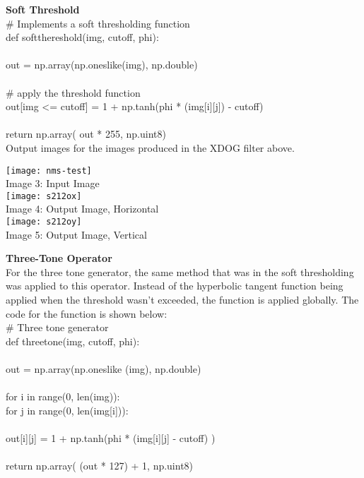 \documentclass{article}
\begin{document}
	\textbf{Soft Threshold}\\
	
	\noindent \# Implements a soft thresholding function\\
	def soft\textunderscore thereshold(img, cutoff, phi):\\
	\\
	\indent out = np.array(np.ones\textunderscore like(img), np.double)\\
	\\
	\indent \# apply the threshold function\\
	\indent out[img <= cutoff] = 1 + np.tanh(phi * (img[i][j]) - cutoff)\\
	\\
	\indent return np.array( out * 255, np.uint8)\\
	
	Output images for the images produced in the XDOG filter above.\\
	
	\begin{center}
		\noindent \texttt{[image: nms-test]}\\
		Image 3: Input Image\\
		
		\texttt{[image: s212ox]}\\
		Image 4: Output Image, Horizontal\\
		
		\texttt{[image: s212oy]}\\
		Image 5: Output Image, Vertical\\
	\end{center}

	\smallskip
	
	\textbf{Three-Tone Operator}\\
	
	For the three tone generator, the same method that was in the soft thresholding was applied to this operator. Instead of the hyperbolic tangent function being applied when the threshold wasn't exceeded, the function is applied globally. The code for the function is shown below:\\
	
	\noindent \# Three tone generator\\
	\noindent def three\textunderscore tone(img, cutoff, phi):\\
	\\
	\indent out = np.array(np.ones\textunderscore like (img), np.double)\\
	\\
	\indent for i in range(0, len(img)):\\
	\indent \indent for j in range(0, len(img[i])):\\
	\\
	\indent \indent \indent out[i][j] = 1 + np.tanh(phi * (img[i][j] - cutoff) )\\
	\\
	\indent return np.array( (out * 127) + 1, np.uint8)\\
	
\end{document}
